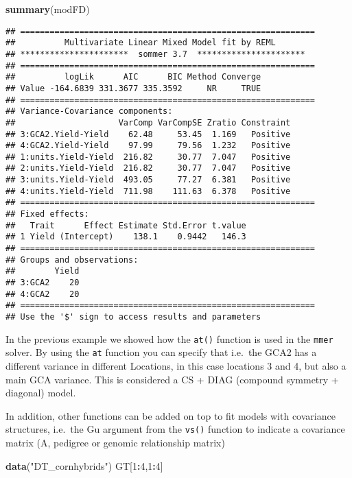 \documentclass[]{article}
\newenvironment{Shaded}{\begin{snugshade}}{\end{snugshade}}
\newcommand{\KeywordTok}[1]{\textcolor[rgb]{0.13,0.29,0.53}{\textbf{#1}}}
\newcommand{\DecValTok}[1]{\textcolor[rgb]{0.00,0.00,0.81}{#1}}
\newcommand{\StringTok}[1]{\textcolor[rgb]{0.31,0.60,0.02}{#1}}
\newcommand{\OperatorTok}[1]{\textcolor[rgb]{0.81,0.36,0.00}{\textbf{#1}}}
\newcommand{\NormalTok}[1]{#1}
\begin{document}
\begin{Shaded}
\begin{Highlighting}[]
\KeywordTok{summary}\NormalTok{(modFD)}
\end{Highlighting}
\end{Shaded}

\begin{verbatim}
## ============================================================
##          Multivariate Linear Mixed Model fit by REML         
## **********************  sommer 3.7  ********************** 
## ============================================================
##          logLik      AIC      BIC Method Converge
## Value -164.6839 331.3677 335.3592     NR     TRUE
## ============================================================
## Variance-Covariance components:
##                     VarComp VarCompSE Zratio Constraint
## 3:GCA2.Yield-Yield    62.48     53.45  1.169   Positive
## 4:GCA2.Yield-Yield    97.99     79.56  1.232   Positive
## 1:units.Yield-Yield  216.82     30.77  7.047   Positive
## 2:units.Yield-Yield  216.82     30.77  7.047   Positive
## 3:units.Yield-Yield  493.05     77.27  6.381   Positive
## 4:units.Yield-Yield  711.98    111.63  6.378   Positive
## ============================================================
## Fixed effects:
##   Trait      Effect Estimate Std.Error t.value
## 1 Yield (Intercept)    138.1    0.9442   146.3
## ============================================================
## Groups and observations:
##        Yield
## 3:GCA2    20
## 4:GCA2    20
## ============================================================
## Use the '$' sign to access results and parameters
\end{verbatim}

In the previous example we showed how the \texttt{at()} function is used
in the \texttt{mmer} solver. By using the \texttt{at} function you can
specify that i.e.~the GCA2 has a different variance in different
Locations, in this case locations 3 and 4, but also a main GCA variance.
This is considered a CS + DIAG (compound symmetry + diagonal) model.

In addition, other functions can be added on top to fit models with
covariance structures, i.e.~the Gu argument from the \texttt{vs()}
function to indicate a covariance matrix (A, pedigree or genomic
relationship matrix)

\begin{Shaded}
\begin{Highlighting}[]
\KeywordTok{data}\NormalTok{(}\StringTok{"DT_cornhybrids"}\NormalTok{)}
\NormalTok{GT[}\DecValTok{1}\OperatorTok{:}\DecValTok{4}\NormalTok{,}\DecValTok{1}\OperatorTok{:}\DecValTok{4}\NormalTok{]}
\end{Highlighting}
\end{Shaded}
\end{document}
